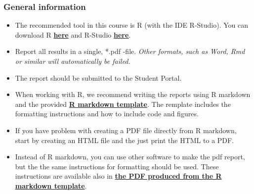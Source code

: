 
\subsubsection*{General information}


\begin{itemize}
\itemsep0em
\item The recommended tool in this course is R (with the IDE R-Studio). You can download R \href{https://cran.r-project.org/}{\textbf{here}} and R-Studio \href{https://www.rstudio.com/products/rstudio/download/}{\textbf{here}}.

\item  Report all results in a single, *.pdf -file. \emph{Other formats, such as Word, Rmd or similar will automatically be failed.}

\item The report should be submitted to the Student Portal.

\item When working with R, we recommend writing the reports using R markdown and the provided \href{https://raw.githubusercontent.com/MansMeg/IntroML/master/templates/assignment_template.rmd}{\textbf{R markdown template}}. The remplate includes the formatting instructions and how to include code and figures.

\item If you have problem with creating a PDF file directly from R markdown, start by creating an HTML file and the just print the HTML to a PDF.

\item Instead of R markdown, you can use other software to make the pdf report, but the the same instructions for formatting should be used. These instructions are available also in \href{https://raw.githubusercontent.com/avehtari/BDA_course_Aalto/master/templates/assignment_template.pdf}{\textbf{the PDF produced from the R markdown template}}.



\end{itemize}
